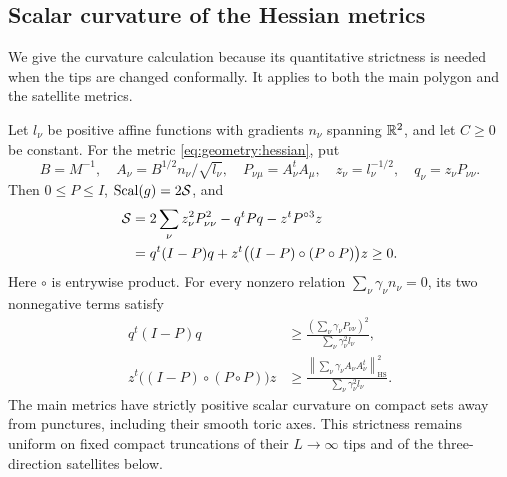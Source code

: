 \subsection{Scalar curvature of the Hessian metrics}

We give the curvature calculation because its quantitative strictness
is needed when the tips are changed conformally.  It applies to both
the main polygon and the satellite metrics.

\begin{lemma}
\label{lem:geometry:scalar}
Let $l_\nu$ be positive affine functions with gradients $n_\nu$
spanning $\mathbb R^2$, and let $C\ge0$ be constant.  For the metric
\eqref{eq:geometry:hessian}, put
\[
 B=M^{-1},\quad
 A_\nu=B^{1/2}n_\nu/\sqrt{l_\nu},\quad
 P_{\nu\mu}=A_\nu^tA_\mu,\quad
 z_\nu=l_\nu^{-1/2},\quad q_\nu=z_\nu P_{\nu\nu}.
\]
Then $0\le P\le I$, $\operatorname{Scal}(g)=2\mathcal S$, and
\begin{align}
 \mathcal S
 &=2\sum_\nu z_\nu^2P_{\nu\nu}^2
     -q^tPq-z^tP^{\circ3}z \notag\\
 &=q^t(I-P)q+
 z^t\bigl((I-P)\circ(P\circ P)\bigr)z\ge0.
 \label{eq:geometry:scalar-identity}
\end{align}
Here $\circ$ is entrywise product.  For every nonzero relation
$\sum_\nu\gamma_\nu n_\nu=0$, its two nonnegative terms satisfy
\begin{align}
 q^t(I-P)q
 &\ge \frac{(\sum_\nu\gamma_\nu P_{\nu\nu})^2}
                    {\sum_\nu\gamma_\nu^2l_\nu},
 \label{eq:geometry:first-bound}\\
 z^t\bigl((I-P)\circ(P\circ P)\bigr)z
 &\ge\frac{\left\|\sum_\nu\gamma_\nu A_\nu A_\nu^t\right\|_{\mathrm{HS}}^2}
                   {\sum_\nu\gamma_\nu^2l_\nu}.
 \label{eq:geometry:second-bound}
\end{align}
The main metrics have strictly positive scalar curvature on compact
sets away from punctures, including their smooth toric axes.  This
strictness remains uniform on fixed compact truncations of their
$L\to\infty$ tips and of the three-direction satellites below.
\end{lemma}


